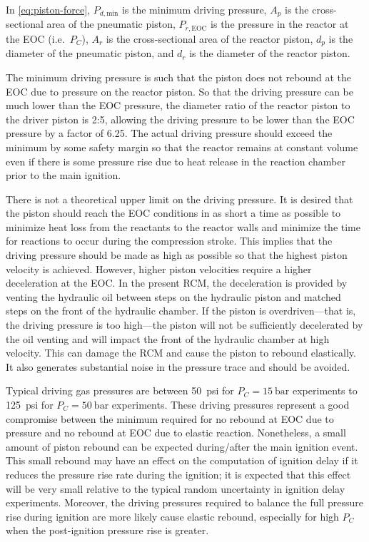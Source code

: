 \documentclass[../main.tex]{subfiles}
\begin{document}
In \cref{eq:piston-force}, $P_{d,\text{min}}$ is the minimum
driving pressure, $A_p$ is the cross-sectional area of the pneumatic piston,
$P_{r,\text{EOC}}$ is the pressure in the reactor at the EOC (i.e.\ $P_C$),
$A_r$ is the cross-sectional area of the reactor piston, $d_p$ is the diameter
of the pneumatic piston, and $d_r$ is the diameter of the reactor piston.

The minimum driving pressure is such that the piston does not rebound at
the EOC due to pressure on the reactor piston. So that the driving
pressure can be much lower than the EOC pressure, the diameter ratio of
the reactor piston to the driver piston is 2:5, allowing the driving pressure
to be lower than the EOC pressure by a factor of 6.25. The actual driving
pressure should exceed the minimum by some safety margin so that the
reactor remains at constant volume even if there is some pressure rise
due to heat release in the reaction chamber prior to the main ignition.

There is not a theoretical upper limit on the driving pressure. It is desired that the piston should
reach the EOC conditions in as short a time as possible to minimize heat
loss from the reactants to the reactor walls and minimize the time for
reactions to occur during the compression stroke. This implies that the
driving pressure should be made as high as possible so that the highest
piston velocity is achieved. However, higher piston velocities require
a higher deceleration at the EOC. In the present RCM, the deceleration
is provided by venting the hydraulic oil between steps on the hydraulic
piston and matched steps on the front of the hydraulic chamber. If the
piston is overdriven---that is, the driving pressure is too high---the
piston will not be sufficiently decelerated by the oil venting and will
impact the front of the hydraulic chamber at high velocity. This can damage
the RCM and cause the piston to rebound elastically. It also generates
substantial noise in the pressure trace and should be avoided.

Typical driving gas pressures are between \SI{50}{psi} for $P_C = \SI{15}{\bar}$ experiments
to  \SI{125}{psi} for $P_C = \SI{50}{\bar}$ experiments. These driving pressures represent a
good compromise between the minimum required for no rebound at EOC due
to pressure and no rebound at EOC due to elastic reaction. Nonetheless,
a small amount of piston rebound can be expected during/after the
main ignition event. This small rebound may have an effect on the computation of
ignition delay if it reduces the pressure rise rate during the ignition;
it is expected that this effect will be very small relative to the
typical random uncertainty in ignition delay experiments. Moreover,
the driving pressures required to balance the full pressure rise during
ignition are more likely cause elastic rebound,
especially for high $P_C$ when the post-ignition pressure rise is greater.
\end{document}
